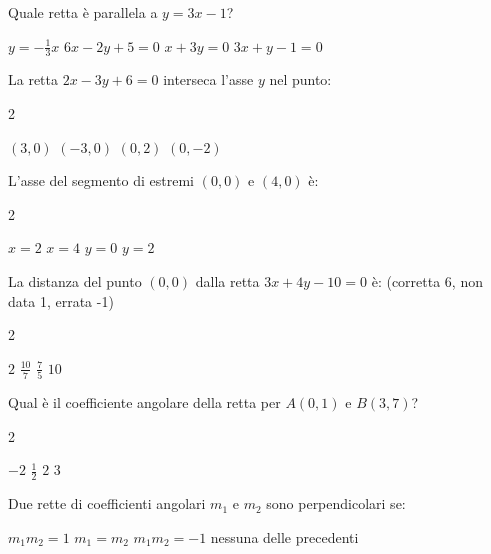 \documentclass[a4paper,10pt]{exam}
\begin{document}
\vspace{2mm}
\begin{questions}
\question Quale retta è parallela a $y=3x-1$?
\vspace{0.2em}
\begin{choices}
\choice $y=-\frac13x$
\choice $6x-2y+5=0$
\choice $x+3y=0$
\choice $3x+y-1=0$
\end{choices}

\question La retta $2x-3y+6=0$ interseca l'asse $y$ nel punto:
\vspace{0.2em}
\begin{multicols}{2}
\begin{choices}
\choice $(3,0)$
\choice $(-3,0)$
\choice $(0,2)$
\choice $(0,-2)$
\end{choices}
\end{multicols}

\question L'asse del segmento di estremi $(0,0)$ e $(4,0)$ è:
\vspace{0.2em}
\begin{multicols}{2}
\begin{choices}
\choice $x=2$
\choice $x=4$
\choice $y=0$
\choice $y=2$
\end{choices}
\end{multicols}

\question La distanza del punto $(0,0)$ dalla retta $3x+4y-10=0$ è: \hfill{\footnotesize (corretta 6, non data 1, errata -1)}
\vspace{0.2em}
\begin{multicols}{2}
\begin{choices}
\choice $2$
\choice $\frac{10}{7}$
\choice $\frac{7}{5}$
\choice $10$
\end{choices}
\end{multicols}

\question Qual è il coefficiente angolare della retta per $A(0,1)$ e $B(3,7)$?
\vspace{0.2em}
\begin{multicols}{2}
\begin{choices}
\choice $-2$
\choice $\frac12$
\choice $2$
\choice $3$
\end{choices}
\end{multicols}

\question Due rette di coefficienti angolari $m_1$ e $m_2$ sono perpendicolari se:
\vspace{0.2em}
\begin{choices}
\choice $m_1m_2=1$
\choice $m_1=m_2$
\choice $m_1m_2=-1$
\choice nessuna delle precedenti
\end{choices}


\end{questions}
\end{document}
